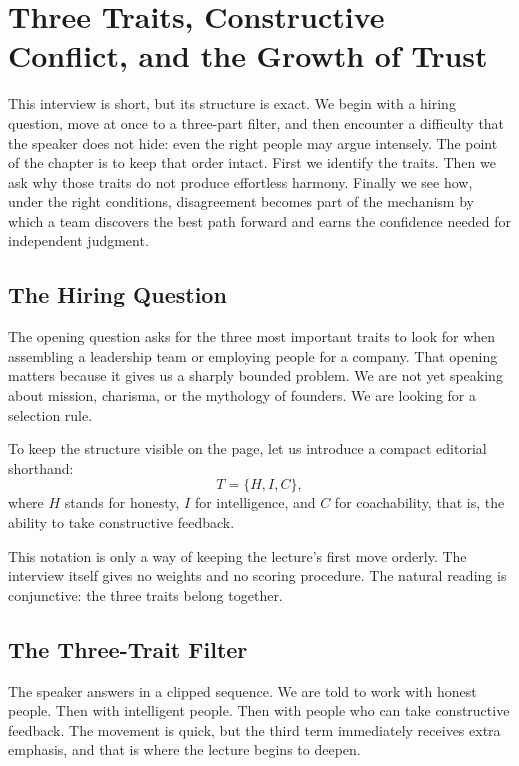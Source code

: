 \chapter{Three Traits, Constructive Conflict, and the Growth of Trust}

This interview is short, but its structure is exact. We begin with a hiring question, move at once to a three-part filter, and then encounter a difficulty that the speaker does not hide: even the right people may argue intensely. The point of the chapter is to keep that order intact. First we identify the traits. Then we ask why those traits do not produce effortless harmony. Finally we see how, under the right conditions, disagreement becomes part of the mechanism by which a team discovers the best path forward and earns the confidence needed for independent judgment.

\section{The Hiring Question}

The opening question asks for the three most important traits to look for when assembling a leadership team or employing people for a company. That opening matters because it gives us a sharply bounded problem. We are not yet speaking about mission, charisma, or the mythology of founders. We are looking for a selection rule.

To keep the structure visible on the page, let us introduce a compact editorial shorthand:
\begin{equation}
T=\{H,I,C\},
\end{equation}
where \(H\) stands for honesty, \(I\) for intelligence, and \(C\) for coachability, that is, the ability to take constructive feedback.

This notation is only a way of keeping the lecture's first move orderly. The interview itself gives no weights and no scoring procedure. The natural reading is conjunctive: the three traits belong together.

\section{The Three-Trait Filter}

The speaker answers in a clipped sequence. We are told to work with honest people. Then with intelligent people. Then with people who can take constructive feedback. The movement is quick, but the third term immediately receives extra emphasis, and that is where the lecture begins to deepen.

